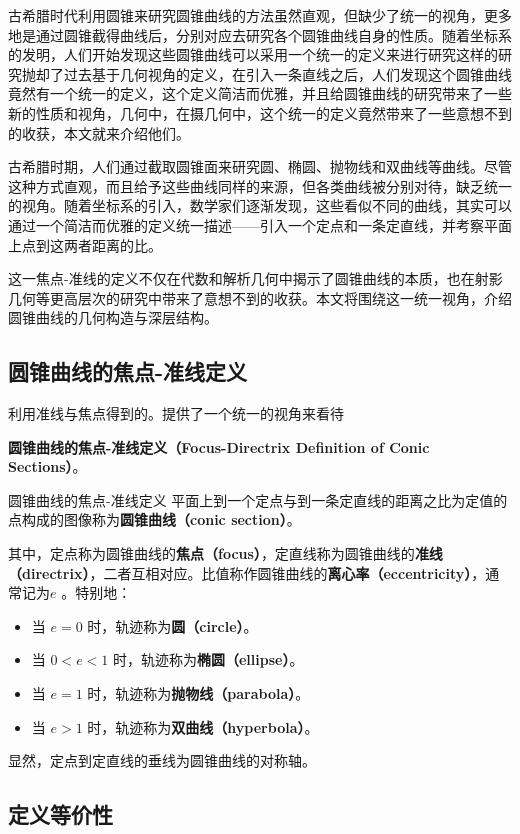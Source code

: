 

古希腊时代利用圆锥来研究圆锥曲线的方法虽然直观，但缺少了统一的视角，更多地是通过圆锥截得曲线后，分别对应去研究各个圆锥曲线自身的性质。随着坐标系的发明，人们开始发现这些圆锥曲线可以采用一个统一的定义来进行研究这样的研究抛却了过去基于几何视角的定义，在引入一条直线之后，人们发现这个圆锥曲线竟然有一个统一的定义，这个定义简洁而优雅，并且给圆锥曲线的研究带来了一些新的性质和视角，几何中，在摄几何中，这个统一的定义竟然带来了一些意想不到的收获，本文就来介绍他们。

古希腊时期，人们通过截取圆锥面来研究圆、椭圆、抛物线和双曲线等曲线。尽管这种方式直观，而且给予这些曲线同样的来源，但各类曲线被分别对待，缺乏统一的视角。随着坐标系的引入，数学家们逐渐发现，这些看似不同的曲线，其实可以通过一个简洁而优雅的定义统一描述——引入一个定点和一条定直线，并考察平面上点到这两者距离的比。

这一焦点-准线的定义不仅在代数和解析几何中揭示了圆锥曲线的本质，也在射影几何等更高层次的研究中带来了意想不到的收获。本文将围绕这一统一视角，介绍圆锥曲线的几何构造与深层结构。


\subsection{圆锥曲线的焦点-准线定义}

利用准线与焦点得到的。提供了一个统一的视角来看待

\textbf{圆锥曲线的焦点-准线定义（Focus-Directrix Definition of Conic Sections）}。

\begin{definition}{圆锥曲线的焦点-准线定义}
平面上到一个定点与到一条定直线的距离之比为定值的点构成的图像称为\textbf{圆锥曲线（conic section）}。

其中，定点称为圆锥曲线的\textbf{焦点（focus）}，定直线称为圆锥曲线的\textbf{准线（directrix）}，二者互相对应。比值称作圆锥曲线的\textbf{离心率（eccentricity）}，通常记为$e$ 。特别地：
\begin{itemize}
\item 当 $e = 0$ 时，轨迹称为\textbf{圆（circle）}。
\item 当 $0 < e < 1$ 时，轨迹称为\textbf{椭圆（ellipse）}。
\item 当 $e = 1$ 时，轨迹称为\textbf{抛物线（parabola）}。
\item 当 $e > 1$ 时，轨迹称为\textbf{双曲线（hyperbola）}。
\end{itemize}
\end{definition}


显然，定点到定直线的垂线为圆锥曲线的对称轴。

\subsection{定义等价性}